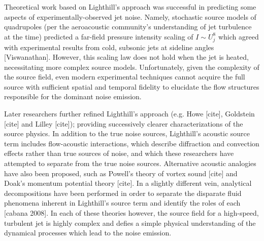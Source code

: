 Theoretical work based on Lighthill's approach was successful in predicting some aspects of experimentally-observed jet noise.
Namely, stochastic source models of quadrupoles (per the aeroacoustic community's understanding of jet turbulence at the time) predicted a far-field pressure intensity scaling of $I \sim U_{j}^{8}$ which agreed with experimental results from cold, subsonic jets at sideline angles [Viswanathan].
However, this scaling law does not hold when the jet is heated, necessitating more complex source models. 
Unfortunately, given the complexity of the source field, even modern experimental techniques cannot acquire the full source with sufficient spatial and temporal fidelity to elucidate the flow structures responsible for the dominant noise emission.

Later researchers further refined Lighthill's approach (e.g. Howe [cite], Goldstein [cite] and Lilley [cite]); providing successively clearer characterizations of the source physics.
In addition to the true noise sources, Lighthill's acoustic source term includes flow-acoustic interactions, which describe diffraction and convection effects rather than true sources of noise, and which these researchers have attempted to separate from the true noise sources.
Alternative acoustic analogies have also been proposed, such as Powell's theory of vortex sound [cite] and Doak's momentum potential theory [cite].
In a slightly different vein, analytical decompositions have been performed in order to separate the disparate fluid phenomena inherent in Lighthill's source term and identify the roles of each [cabana 2008].
In each of these theories however, the source field for a high-speed, turbulent jet is highly complex and defies a simple physical understanding of the dynamical processes which lead to the noise emission.   

